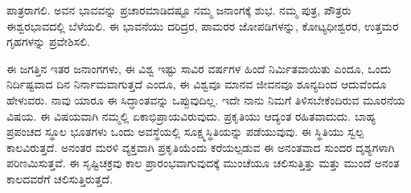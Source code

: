 ಪಾತ್ರರಾಗಲಿ. ಅವನ ಭಾವವನ್ನು ಪ್ರಚಾರಮಾಡಿದಷ್ಟೂ ನಮ್ಮ ಜನಾಂಗಕ್ಕೆ ಶುಭ. ನಮ್ಮ ಪುತ್ರ, ಪೌತ್ರರು ಈಶ್ವರಭಾವದಲ್ಲಿ ಬೆಳೆಯಲಿ. ಈ ಭಾವನೆಯು ದರಿದ್ರರ, ಪಾಮರರ ಜೋಪಡಿಗಳನ್ನು, ಕೋಟ್ಯಧೀಶ್ವರರ, ಉತ್ತಮರ ಗೃಹಗಳನ್ನು ಪ್ರವೇಶಿಸಲಿ.

ಈ ಜಗತ್ತಿನ ಇತರ ಜನಾಂಗಗಳು, ಈ ವಿಶ್ವ ಇಷ್ಟು ಸಾವಿರ ವರ್ಷಗಳ ಹಿಂದೆ ನಿರ್ಮಿತವಾಯಿತು ಎಂದೂ, ಒಂದು ನಿರ್ದಿಷ್ಟವಾದ ದಿನ ನಿರ್ನಾಮವಾಗುತ್ತದೆ ಎಂದೂ, ಈ ವಿಶ್ವವೂ ಮಾನವ ಜೀವನವೂ ಶೂನ್ಯದಿಂದ ಆದುವೆಂದೂ ಹೇಳುವರು. ನಾವು ಯಾರೂ ಈ ಸಿದ್ಧಾಂತವನ್ನು ಒಪ್ಪುವುದಿಲ್ಲ. ಇದೇ ನಾನು ನಿಮಗೆ ತಿಳಿಸಬೇಕೆಂದಿರುವ ಮೂರನೆಯ ವಿಷಯ. ಈ ವಿಷಯವಾಗಿ ನಮ್ಮಲ್ಲಿ ಏಕಾಭಿಪ್ರಾಯವಿರುವುದು. ಪ್ರಕೃತಿಯು ಆದ್ಯಂತ ರಹಿತವಾದುದು. ಬಾಹ್ಯ ಪ್ರಪಂಚದ ಸ್ಥೂಲ ಭೂತಗಳು ಒಂದು ಅವಸ್ಥೆಯಲ್ಲಿ ಸೂಕ್ಷ್ಮಸ್ಥಿತಿಯನ್ನು ಪಡೆಯುವುವು. ಈ ಸ್ಥಿತಿಯು ಸ್ವಲ್ಪ ಕಾಲವಿರುತ್ತದೆ. ಅನಂತರ ಮರಳಿ ವ್ಯಕ್ತವಾಗಿ ಪ್ರಕೃತಿಯೆಂದು ಕರೆಯಲ್ಪಡುವ ಈ ಅನಂತವಾದ ಸುಂದರ ದೃಶ್ಯಗಳಾಗಿ ಪರಿಣಮಿಸುತ್ತವೆ. ಈ ಸೃಷ್ಟಿಚಕ್ರವು ಕಾಲ ಪ್ರಾರಂಭವಾಗುವುದಕ್ಕೆ ಮುಂಚೆಯೂ ಚಲಿಸುತ್ತಿತ್ತು ಮತ್ತು ಮುಂದೆ ಅನಂತ ಕಾಲದವರೆಗೆ ಚಲಿಸುತ್ತಿರುತ್ತದೆ.

